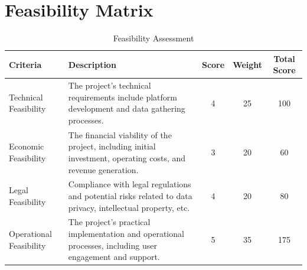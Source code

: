 \documentclass[titlepage]{article}
\begin{document}
\section{Feasibility Matrix}


\begin{table}[h]
    \centering
    \caption{Feasibility Assessment}
    \label{table:feasibility}
    \begin{tabular}{>{\raggedright}m{3.5cm} >{\raggedright\arraybackslash}m{5.5cm} c c c}
    \toprule
    \textbf{Criteria} & \textbf{Description} & \textbf{Score} & \textbf{Weight} & \textbf{Total Score} \\ 
    \midrule
    \rowcolor{lightgray} Technical Feasibility & The project's technical requirements include platform development and data gathering processes. & 4 & 25 & 100 \\
    Economic Feasibility & The financial viability of the project, including initial investment, operating costs, and revenue generation. & 3 & 20 & 60 \\
    \rowcolor{lightgray} Legal Feasibility & Compliance with legal regulations and potential risks related to data privacy, intellectual property, etc. & 4 & 20 & 80 \\
    Operational Feasibility & The project's practical implementation and operational processes, including user engagement and support. & 5 & 35 & 175 \\
    \bottomrule
    \end{tabular}
    \end{table}
\end{document}
